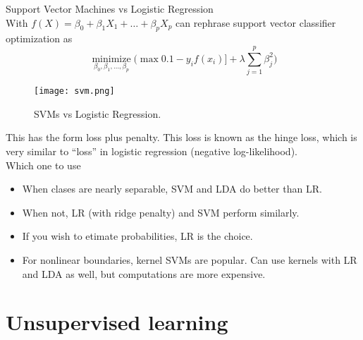 \documentclass[11pt, a4paper]{article}
\begin{document}
Support Vector Machines vs Logistic Regression\\
With $f(X)=\beta_0+\beta_1X_1+\dots+\beta_pX_p$ can rephrase support vector classifier optimization as
\[
\underset{\beta_0,\beta_1,\dots,\beta_p}{\operatorname{minimize}}\bigg( \max 0.1-y_i f(x_i)]+\lambda\sum_{j=1}^p\beta_j^2\bigg)
\]
\begin{figure}
[h!]
\centering
\texttt{[image: svm.png]}
\caption{SVMs vs Logistic Regression.}
\end{figure}
This has the form loss plus penalty. This loss is known as the hinge loss, which is very similar to ``loss'' in logistic regression (negative log-likelihood).\\
Which one to use
\begin{itemize}
\item When clases are nearly separable, SVM and LDA do better than LR.
\item When not, LR (with ridge penalty) and SVM perform similarly.
\item If you wish to etimate probabilities, LR is the choice.
\item For nonlinear boundaries, kernel SVMs are popular. Can use kernels with LR and LDA as well, but computations are more expensive.
\end{itemize}
\section{Unsupervised learning}
\end{document}
